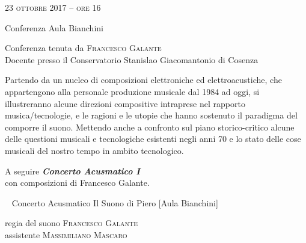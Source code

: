 
\begin{flushleft}

\large{
	\scshape{
	23 ottobre 2017 -- ore 16
	}}

\medskip
	
\small{Conferenza
	\newline Aula Bianchini}

\medskip

{\fontsize{18}{18} }

\normalfont

\normalsize

\bigskip

Conferenza tenuta da \textsc{Francesco Galante}\\{\footnotesize Docente presso il Conservatorio Stanislao Giacomantonio di Cosenza}

\bigskip

Partendo da un nucleo di composizioni elettroniche ed elettroacustiche, che appartengono alla personale produzione musicale dal 1984 ad oggi, si illustreranno alcune  direzioni compositive intraprese nel rapporto musica/tecnologie, e le ragioni e le utopie  che hanno sostenuto il paradigma del comporre il suono. Mettendo anche a confronto sul piano storico-critico alcune delle questioni musicali e tecnologiche esistenti negli anni 70 e lo stato delle cose musicali del nostro tempo in ambito tecnologico.

\bigskip

A seguire \textbf{\emph{Concerto Acusmatico I}}\\
con composizioni di Francesco Galante.



~\vfill
%
%	
\small{Concerto Acusmatico
	\newline Il Suono di Piero [Aula Bianchini]}

\medskip


{\fontsize{20}{20} }

\normalsize

\medskip

regia del suono \textsc{Francesco Galante}\\
assistente \textsc{Massimiliano Mascaro}

\bigskip


\end{flushleft}
